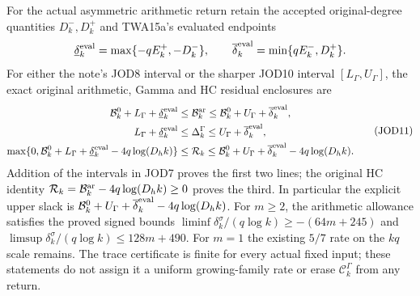 For the actual asymmetric arithmetic return retain the accepted
original-degree quantities $D_k^-,D_k^+$ and TWA15a's evaluated
endpoints
\[
 \underline\delta_k^{\rm eval}=\max\{-qE_k^+,-D_k^-\},\qquad
 \overline\delta_k^{\rm eval}=\min\{qE_k^-,D_k^+\}.
\]
For either the note's JOD8 interval
or the sharper JOD10 interval $[L_\Gamma,U_\Gamma]$, the exact
original arithmetic, Gamma and HC residual enclosures are
\[
\begin{aligned}
 \mathcal B_k^0+L_\Gamma+\underline\delta_k^{\rm eval}
 &\leq\mathcal B_k^{\rm ar}
 \leq\mathcal B_k^0+U_\Gamma+\overline\delta_k^{\rm eval},\\
 L_\Gamma+\underline\delta_k^{\rm eval}&\leq\Delta_k^\Gamma
                         \leq U_\Gamma+\overline\delta_k^{\rm eval},\\
 \max\{0,\mathcal B_k^0+L_\Gamma+\underline\delta_k^{\rm eval}
                         -4q\log(D_hk)\}
 &\leq\mathcal R_k
 \leq\mathcal B_k^0+U_\Gamma+\overline\delta_k^{\rm eval}-4q\log(D_hk).
\end{aligned}\tag{JOD11}
\]
Addition of the intervals in JOD7 proves the first two lines;
the original HC identity
$\mathcal R_k=\mathcal B_k^{\rm ar}-4q\log(D_hk)\geq0$
proves the third. In particular the explicit upper slack is
$\mathcal B_k^0+U_\Gamma+\overline\delta_k^{\rm eval}-4q\log(D_hk)$.
For $m\geq2$, the arithmetic allowance satisfies the proved
signed bounds $\liminf\delta_k^\sigma/(q\log k)\geq-(64m+245)$
and $\limsup\delta_k^\sigma/(q\log k)\leq128m+490$.
For $m=1$ the existing $5/7$ rate on the $kq$ scale remains.
The trace certificate is finite for every actual fixed input;
these statements do not assign it a uniform growing-family
rate or erase $\mathcal C_k^\Gamma$ from any return.
